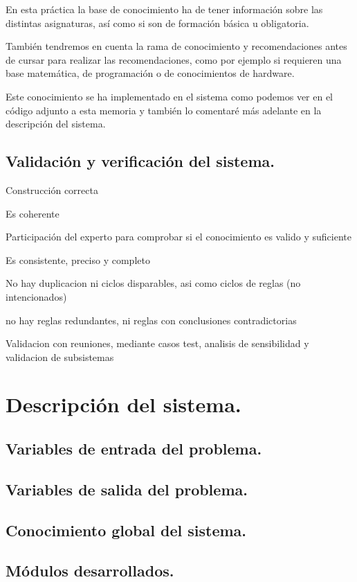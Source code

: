\documentclass[12pt, spanish]{article}
\begin{document}
En esta práctica la base de conocimiento ha de tener información sobre las distintas asignaturas, así como si son de formación básica u obligatoria.

También tendremos en cuenta la rama de conocimiento y recomendaciones antes de cursar para realizar las recomendaciones, como por ejemplo si requieren una base matemática, de programación o de conocimientos de hardware.

Este conocimiento se ha implementado en el sistema como podemos ver en el código adjunto a esta memoria y también lo comentaré más adelante en la descripción del sistema.

\subsection{Validación y verificación del sistema.}

Construcción correcta

Es coherente

Participación del experto para comprobar si el conocimiento es valido y suficiente

Es consistente, preciso y completo

No hay duplicacion ni ciclos disparables, asi como ciclos de reglas (no intencionados)

no hay reglas redundantes, ni reglas con conclusiones contradictorias

Validacion con reuniones, mediante casos test, analisis de sensibilidad y validacion de subsistemas 

\section{Descripción del sistema.}

\subsection{Variables de entrada del problema.}

\subsection{Variables de salida del problema.}

\subsection{Conocimiento global del sistema.}

\subsection{Módulos desarrollados.}
\end{document}
